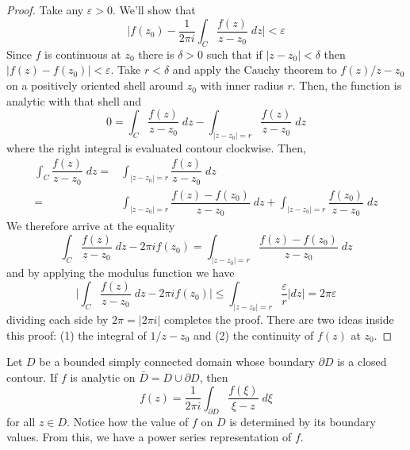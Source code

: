 \vspace{2ex}
\begin{proof}
Take any $\varepsilon >0$. We'll show that
\[\Big|f(z_0)-\dfrac{1}{2\pi i}\int _{C}\dfrac{f(z)}{z-z_0}\;dz\Big|<\varepsilon \]
Since $f$ is continuous at $z_0$ there is $\delta >0$ such that if $|z-z_0|<\delta $ then $|f(z)-f(z_0)|<\varepsilon $. Take $r<\delta $ and apply the Cauchy theorem to $f(z)/z-z_0$ on a positively oriented shell around $z_0$ with inner radius $r$. Then, the function is analytic with that shell and
\[0=\int _{C}\dfrac{f(z)}{z-z_0}\;dz-\int _{|z-z_0|=r}\dfrac{f(z)}{z-z_0}\;dz\]
where the right integral is evaluated contour clockwise. Then,
\begin{align*}
\int _{C}\dfrac{f(z)}{z-z_0}\;dz=&\int_{|z-z_0|=r}\dfrac{f(z)}{z-z_0}\;dz\\
=&\int _{|z-z_0|=r}\dfrac{f(z)-f(z_0)}{z-z_0}\;dz+\int _{|z-z_0|=r}\dfrac{f(z_0)}{z-z_0}\;dz
\end{align*}
We therefore arrive at the equality
\[\int _{C}\dfrac{f(z)}{z-z_0}\;dz-2\pi if(z_0)=\int _{|z-z_0|=r}\dfrac{f(z)-f(z_0)}{z-z_0}\;dz\]
and by applying the modulus function we have
\[\Big|\int_{C}\dfrac{f(z)}{z-z_0}\;dz-2\pi if(z_0)\Big|\leq \int _{|z-z_0|=r}\dfrac{\varepsilon }{r}|dz|=2\pi \varepsilon \]
dividing each side by $2\pi =|2\pi i|$ completes the proof. There are two ideas inside this proof: (1) the integral of $1/z-z_0$ and (2) the continuity of $f(z)$ at $z_0$. 
\end{proof}
\vspace{2ex}
\begin{rmk}
Let $D$ be a bounded simply connected domain whose boundary $\partial D$ is a closed contour. If $f$ is analytic on $\bar{D}=D\cup \partial D$, then
\[f(z)=\dfrac{1}{2\pi i}\int _{\partial D}\dfrac{f(\xi )}{\xi -z}\;d\xi \]
for all $z\in D$. Notice how the value of $f$ on $D$ is determined by its boundary values. From this, we have a power series representation of $f$. 
\end{rmk}
\vspace{2ex}

